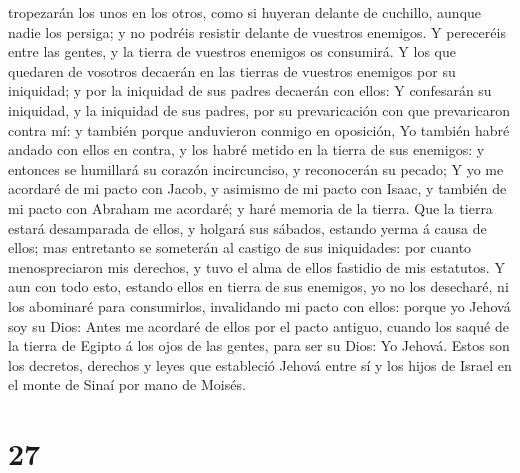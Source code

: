 tropezarán los unos en los otros, como si huyeran delante de cuchillo,
aunque nadie los persiga; y no podréis resistir delante de vuestros
enemigos.  Y pereceréis entre las gentes, y la tierra de
vuestros enemigos os consumirá.  Y los que quedaren de
vosotros decaerán en las tierras de vuestros enemigos por su iniquidad;
y por la iniquidad de sus padres decaerán con ellos:  Y
confesarán su iniquidad, y la iniquidad de sus padres, por su
prevaricación con que prevaricaron contra mí: y también porque
anduvieron conmigo en oposición,  Yo también habré andado
con ellos en contra, y los habré metido en la tierra de sus enemigos: y
entonces se humillará su corazón incircunciso, y reconocerán su pecado;
 Y yo me acordaré de mi pacto con Jacob, y asimismo de mi
pacto con Isaac, y también de mi pacto con Abraham me acordaré; y haré
memoria de la tierra.  Que la tierra estará desamparada de
ellos, y holgará sus sábados, estando yerma á causa de ellos; mas
entretanto se someterán al castigo de sus iniquidades: por cuanto
menospreciaron mis derechos, y tuvo el alma de ellos fastidio de mis
estatutos.  Y aun con todo esto, estando ellos en tierra de
sus enemigos, yo no los desecharé, ni los abominaré para consumirlos,
invalidando mi pacto con ellos: porque yo Jehová soy su Dios:
 Antes me acordaré de ellos por el pacto antiguo, cuando
los saqué de la tierra de Egipto á los ojos de las gentes, para ser su
Dios: Yo Jehová.  Estos son los decretos, derechos y leyes
que estableció Jehová entre sí y los hijos de Israel en el monte de
Sinaí por mano de Moisés.

\hypertarget{section-26}{%
\section{27}\label{section-26}}

